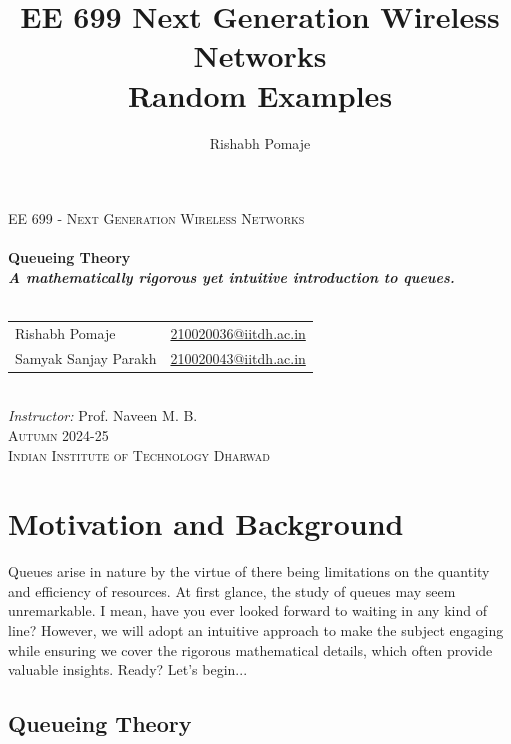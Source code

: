 \documentclass[11pt, a4paper]{report}
\title{\Huge{EE 699 Next Generation Wireless Networks}\\ Random Examples}
\author{\huge{Rishabh Pomaje}}
\date{}
\begin{document}
\vspace*{\fill}
\begin{center}
    \textsc{\LARGE EE 699 - Next Generation Wireless Networks}\\[0.6cm]
    \noindent\makebox[\linewidth]{\rule{0.7\paperwidth}{0.6pt}}\\[0.8cm]

    { \Huge \bfseries Queueing Theory \\[0.4cm] \Large \textit{A mathematically rigorous yet intuitive introduction to queues.}}\\[0.3cm]
    \noindent\makebox[\linewidth]{\rule{0.7\paperwidth}{0.6pt}}\\[0.8cm]

    \begin{tabular}{l l}
        \Large Rishabh Pomaje & \Large \href{mailto:210020036@iitdh.ac.in}{210020036@iitdh.ac.in} \\[0.5cm]
        \Large Samyak Sanjay Parakh & \Large \href{mailto:210020043@iitdh.ac.in}{210020043@iitdh.ac.in} \\[1.5cm]
    \end{tabular}\\
    \Large \textit{Instructor: }Prof. Naveen M. B.\\[5cm]

    \textsc{\Large Autumn 2024-25\\[0.3cm] Indian Institute of Technology Dharwad}
\end{center}
\vspace*{\fill}


\newpage%

\tableofcontents
\pagebreak

\chapter{Motivation and Background}
Queues arise in nature by the virtue of there being limitations on the quantity and efficiency of resources. At first glance, the study of queues may seem unremarkable. I mean, have you ever looked forward to waiting in any kind of line? However, we will adopt an intuitive approach to make the subject engaging while ensuring we cover the rigorous mathematical details, which often provide valuable insights. Ready? Let's begin...

\section{Queueing Theory}
\end{document}
